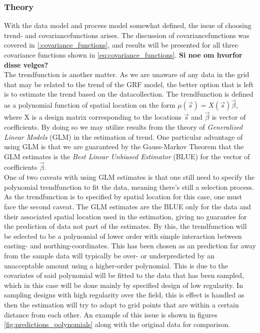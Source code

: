 \documentclass{article}
\begin{document}
\subsubsection{Theory}
With the data model and process model somewhat defined, the issue of choosing trend- and covariancefunctions arises. The discussion of covariancefunctions was covered in \ref{:covariance_functions}, and results will be presented for all three covariance functions shown in \ref{eq:covariance_functions}. \textbf{Si noe om hvorfor disse velges?} \\ 
The trendfunction is another matter. As we are unaware of any data in the grid that may be related to the trend of the GRF model, the better option that is left is to estimate the trend based on the datacollection. The trendfunction is defined as a polynomial function of spatial location on the form $\mu(\vec{s}) = X(\vec{s})\vec{\beta}$, where X is a design matrix corresponding to the locations $\vec{s}$ and $\vec{\beta}$ is vector of coefficients. By doing so we may utilize results from the theory of \textit{Generalized Linear Models} (GLM) in the estimation of trend. One particular advantage of using GLM is that we are guaranteed by the Gauss-Markov Theorem that the GLM estimates is the \textit{Best Linear Unbiased Estimator} (BLUE) for the vector of coefficients $\vec{\beta}$. \\

One of two caveats with using GLM estimates is that one still need to specify the polynomial trendfunction to fit the data, meaning there's still a selection process. As the trendfunction is to specified by spatial location for this case, one must face the second caveat. The GLM estimates are the BLUE only for the data and their associated spatial location used in the estimation, giving no guarantee for the prediction of data not part of the estimates. By this, the trendfunction will be selected to be a polynomial of lower order with simple interaction between easting- and northing-coordinates. This has been chosen as an prediction far away from the sample data will typically be over- or underpredicted by an unacceptable amount using a higher-order polynomial. This is due to the covariates of said polynomial will be fitted to the data that has been sampled, which in this case will be done mainly by specified design of low regularity. In sampling designs with high regularity over the field, this is effect is handled as then the estimation will try to adapt to grid points that are within a certain distance from each other. An example of this issue is shown in figures \ref{fig:predictions_polynomials} along with the original data for comparison.  \\
\end{document}
